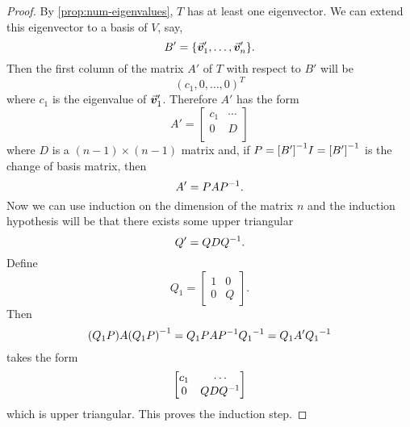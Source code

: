 \documentclass[../MathsNotesBase.tex]{subfiles}
\begin{document}
{		\medskip{}
		

	
		\bigskip
		\begin{proof}
			By \autoref{prop:num-eigenvalues}, $T$ has at least one eigenvector. We can extend this eigenvector to a basis of $V$, say,
			\[ B' = \{\vec{\bm{v}}_1',\dots,\vec{\bm{v}}_n'\}. \]
			Then the first column of the matrix $A'$ of $T$ with respect to $B'$ will be
			\[ (c_1,0,\dots,0)^T \]
			where $c_1$ is the eigenvalue of $\vec{\bm{v}}_1'$. Therefore $A'$ has the form
			\[
				A' = \begin{bmatrix}
					c_1 & \cdots \\
					0   &   D \\
					\end{bmatrix} 
			\]
			where $D$ is a ${ (n-1) \times (n-1) }$ matrix and, if ${ P = {[B']}^{-1}I = {[B']}^{-1} }$ is the change of basis matrix, then
			\[ A' = PA{P}^{-1}. \]
			Now we can use induction on the dimension of the matrix $n$ and the induction hypothesis will be that there exists some upper triangular
			\[ Q' = QD{Q}^{-1}. \]
			Define
			\[ Q_1 = \begin{bmatrix}
					1 & 0\\
					0 & Q
					\end{bmatrix}. 
			\]
			Then
			\[ (Q_1P)A{(Q_1P)}^{-1} = Q_1PA{P}^{-1}{Q_1}^{-1} = Q_1A'{Q_1}^{-1} \]
			takes the form
			\[
				\begin{bmatrix}
				c_1 & \cdots\\
				0   & QD{Q}^{-1}
				\end{bmatrix} 
			\]
			which is upper triangular. This proves the induction step.
		\end{proof}
	
		\medskip{}

}
\end{document}
